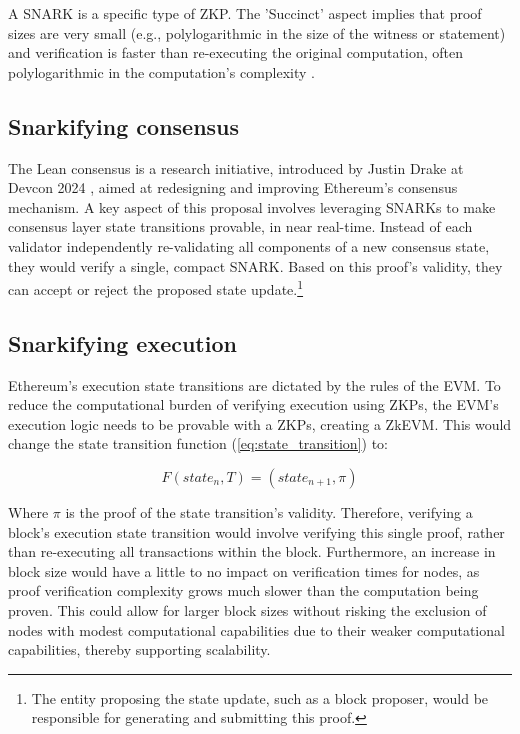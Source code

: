A SNARK is a specific type of ZKP. The 'Succinct' aspect implies that proof
sizes are very small (e.g., polylogarithmic in the size of the witness or
statement) and verification is faster than re-executing the original
computation, often polylogarithmic in the computation's complexity \cite{BCCT11}.

\subsection{Snarkifying consensus}

The Lean consensus \cite{LeanConsensus} is a research initiative, introduced
by Justin Drake at Devcon 2024 \cite{JustinDrakeBeamchain}, aimed at redesigning and improving
Ethereum's consensus mechanism. A key aspect of this proposal involves
leveraging SNARKs to make consensus layer state transitions provable, in near
real-time. Instead of each validator independently re-validating all
components of a new consensus state, they would verify a single, compact
SNARK. Based on this proof's validity, they can accept or
reject the proposed state update.\footnote{The entity proposing the state
	update, such as a block proposer, would be responsible for generating and
	submitting this proof.}

\subsection{Snarkifying execution}\label{subsec:snarkifying_execution}

Ethereum's execution state transitions are dictated by the rules of the
EVM. To reduce the computational burden of verifying execution using ZKPs, the
EVM's execution logic needs to be provable with a ZKPs, creating a ZkEVM. This
would change the state transition function (\ref{eq:state_transition}) to:

\begin{equation}
	F(state_n, T) = (state_{n+1}, \pi)
\end{equation}

Where $\pi$ is the proof of the state transition's validity. Therefore,
verifying a block's execution state transition would involve verifying this
single proof, rather than re-executing all transactions within the block.
Furthermore, an increase in block size would have a little to no impact on
verification times for nodes, as proof verification complexity grows
much slower than the computation being proven. This could allow for larger
block sizes without risking the exclusion of nodes with modest computational
capabilities due to their weaker computational capabilities, thereby
supporting scalability.

